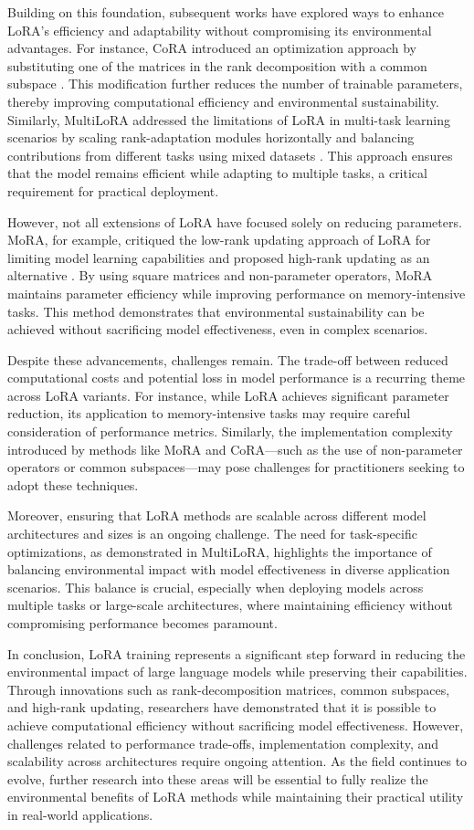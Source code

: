 \documentclass[conference]{IEEEtran}
\begin{document}
Building on this foundation, subsequent works have explored ways to enhance LoRA's efficiency and adaptability without compromising its environmental advantages. For instance, CoRA introduced an optimization approach by substituting one of the matrices in the rank decomposition with a common subspace \cite{bX}. This modification further reduces the number of trainable parameters, thereby improving computational efficiency and environmental sustainability. Similarly, MultiLoRA addressed the limitations of LoRA in multi-task learning scenarios by scaling rank-adaptation modules horizontally and balancing contributions from different tasks using mixed datasets \cite{bX}. This approach ensures that the model remains efficient while adapting to multiple tasks, a critical requirement for practical deployment.

However, not all extensions of LoRA have focused solely on reducing parameters. MoRA, for example, critiqued the low-rank updating approach of LoRA for limiting model learning capabilities and proposed high-rank updating as an alternative \cite{bX}. By using square matrices and non-parameter operators, MoRA maintains parameter efficiency while improving performance on memory-intensive tasks. This method demonstrates that environmental sustainability can be achieved without sacrificing model effectiveness, even in complex scenarios.

Despite these advancements, challenges remain. The trade-off between reduced computational costs and potential loss in model performance is a recurring theme across LoRA variants. For instance, while LoRA achieves significant parameter reduction, its application to memory-intensive tasks may require careful consideration of performance metrics. Similarly, the implementation complexity introduced by methods like MoRA and CoRA—such as the use of non-parameter operators or common subspaces—may pose challenges for practitioners seeking to adopt these techniques.

Moreover, ensuring that LoRA methods are scalable across different model architectures and sizes is an ongoing challenge. The need for task-specific optimizations, as demonstrated in MultiLoRA, highlights the importance of balancing environmental impact with model effectiveness in diverse application scenarios. This balance is crucial, especially when deploying models across multiple tasks or large-scale architectures, where maintaining efficiency without compromising performance becomes paramount.

In conclusion, LoRA training represents a significant step forward in reducing the environmental impact of large language models while preserving their capabilities. Through innovations such as rank-decomposition matrices, common subspaces, and high-rank updating, researchers have demonstrated that it is possible to achieve computational efficiency without sacrificing model effectiveness. However, challenges related to performance trade-offs, implementation complexity, and scalability across architectures require ongoing attention. As the field continues to evolve, further research into these areas will be essential to fully realize the environmental benefits of LoRA methods while maintaining their practical utility in real-world applications.
\end{document}
